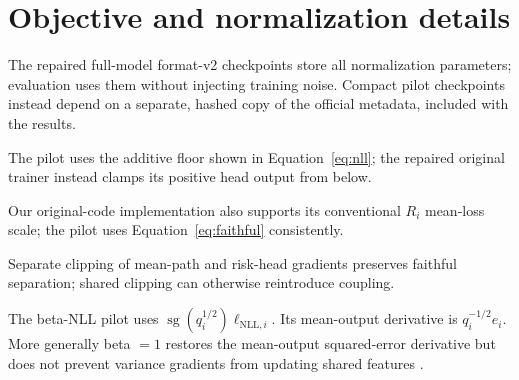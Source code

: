 \section{Objective and normalization details}
\label{sec:implementation-details}
The repaired full-model format-v2 checkpoints store all normalization parameters; evaluation uses them without injecting training noise. Compact pilot checkpoints instead depend on a separate, hashed copy of the official metadata, included with the results.

The pilot uses the additive floor shown in Equation~\ref{eq:nll}; the repaired original trainer instead clamps its positive head output from below.

Our original-code implementation also supports its conventional $R_i$ mean-loss scale; the pilot uses Equation~\ref{eq:faithful} consistently.

Separate clipping of mean-path and risk-head gradients preserves faithful separation; shared clipping can otherwise reintroduce coupling.

The beta-NLL pilot uses
$\operatorname{sg}(q_i^{1/2})\ell_{\mathrm{NLL},i}$.
Its mean-output derivative is $q_i^{-1/2}e_i$. More generally beta $=1$ restores the mean-output squared-error derivative but does not prevent variance gradients from updating shared features \citep{stirn2023}.

